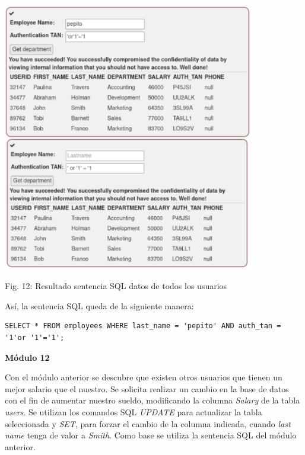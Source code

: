 \documentclass[12pt,oneside,a4paper]{book}
\begin{document}
\begin{enumerate}
\begin{enumerate}
        \vspace{2em}
        
        \begin{center}
            \includegraphics[width=11cm]{img/sqli9.png}
            
            \vspace{0.1em}
            
            Fig. 12: Resultado sentencia SQL datos de todos los usuarios
        \end{center}

        \newpage

        \hspace{20pt}
        Así, la sentencia SQL queda de la siguiente manera:
        
        \begin{verbatim}
SELECT * FROM employees WHERE last_name = 'pepito' AND auth_tan =
'1'or '1'='1';
        \end{verbatim}

        \vspace{2em}

        \textbf{Módulo 12}
        
        \vspace{1em}

        \hspace{20pt}
        Con el módulo anterior se descubre que existen otros usuarios que tienen un mejor salario que el nuestro. Se solicita realizar un cambio en la base de datos con el fin de aumentar nuestro sueldo, modificando la columna \textit{Salary} de la tabla \textit{users}. Se utilizan los comandos SQL \textit{UPDATE} para actualizar la tabla seleccionada y \textit{SET}, para forzar el cambio de la columna indicada, cuando \textit{last name} tenga de valor a \textit{Smith}. Como base se utiliza la sentencia SQL del módulo anterior.


\end{enumerate}
\end{enumerate}
\end{document}
